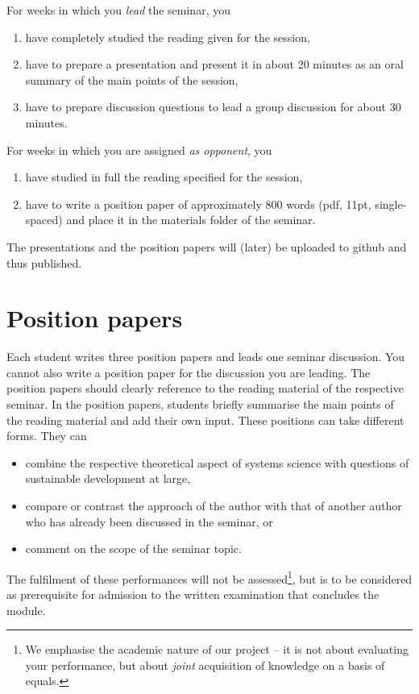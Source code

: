 \documentclass[11pt,a4paper]{article}
\begin{document}
For weeks in which you \emph{lead} the seminar, you 
\begin{enumerate}
\item have completely studied the reading given for the session,
\item have to prepare a presentation and present it in about 20 minutes as an
  oral summary of the main points of the session,
\item have to prepare discussion questions to lead a group discussion for
  about 30 minutes.
\end{enumerate}
For weeks in which you are assigned \emph{as opponent}, you 
\begin{enumerate}
\item have studied in full the reading specified for the session, 
\item have to write a position paper of approximately 800 words (pdf, 11pt,
  single-spaced) and place it in the materials folder of the seminar.
\end{enumerate}

The presentations and the position papers will (later) be uploaded to github
and thus published.

\section{Position papers}

Each student writes three position papers and leads one seminar discussion.
You cannot also write a position paper for the discussion you are leading.
The position papers should clearly reference to the reading material of the
respective seminar. In the position papers, students briefly summarise the
main points of the reading material and add their own input. These positions
can take different forms. They can
\begin{itemize}
\item combine the respective theoretical aspect of systems science with
  questions of sustainable development at large,
\item compare or contrast the approach of the author with that of another
  author who has already been discussed in the seminar, or
\item comment on the scope of the seminar topic.
\end{itemize}
The fulfilment of these performances will not be assessed\footnote{We
  emphasise the academic nature of our project -- it is not about evaluating
  your performance, but about \emph{joint} acquisition of knowledge on a basis
  of equals.}, but is to be considered as prerequisite for admission to the
written examination that concludes the module.
\end{document}

